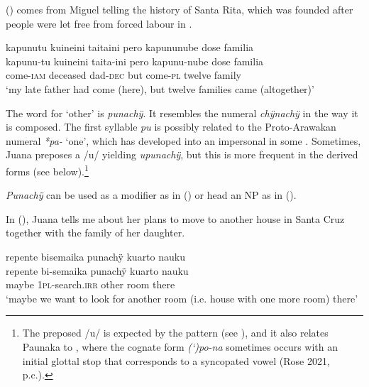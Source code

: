 () comes from Miguel telling the history of Santa Rita, which was founded after people were let free from forced labour in .

\ea\label{ex:twelve-2}
\begingl 
\glpreamble kapunutu kuineini taitaini pero kapununube dose familia\\
\gla kapunu-tu kuineini taita-ini pero kapunu-nube dose familia\\ 
\glb come-\textsc{iam} deceased dad-\textsc{dec} but come-\textsc{pl} twelve family\\ 
\glft ‘my late father had come (here), but twelve families came (altogether)’
\trailingcitation{[mxx-p110825l.056]}
\xe

The word for ‘other’ is \textit{punachÿ}. It resembles the numeral \textit{chÿnachÿ} in the way it is composed. The first syllable \textit{pu} is possibly related to the Proto-Arawakan numeral \textit{*pa-} ‘one’, which has developed into an impersonal  in some  \citep[85]{Aikhenvald1999}. Sometimes, Juana preposes a /u/ yielding \textit{upunachÿ}, but this is more frequent in the derived forms (see below).\footnote{The preposed /u/ is expected by the  pattern (see ), and it also relates Paunaka to , where the cognate form \textit{(‘)po-na} sometimes occurs with an initial glottal stop that corresponds to a syncopated vowel (Rose 2021, p.c.).}

\textit{Punachÿ} can be used as a modifier as in () or head an NP as in (). 

In (), Juana tells me about her plans to move to another house in Santa Cruz together with the family of her daughter.

\ea\label{ex:other-2}
\begingl
\glpreamble repente bisemaika punachÿ kuarto nauku\\
\gla repente bi-semaika punachÿ kuarto nauku\\
\glb maybe 1\textsc{pl}-search.\textsc{irr} other room there\\
\glft ‘maybe we want to look for another room (i.e. house with one more room) there’
\endgl
\trailingcitation{[jxx-p120430l-1.355]}
\xe



